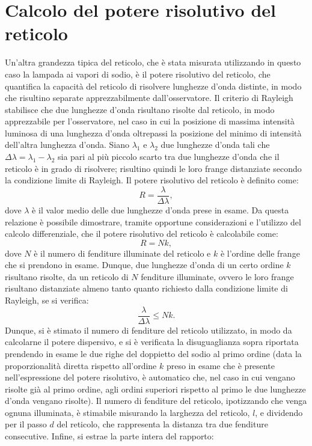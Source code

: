 \documentclass[a4paper,12pt]{article}
\begin{document}
\section{Calcolo del potere risolutivo del reticolo}
Un’altra grandezza tipica del reticolo, che è stata misurata utilizzando in questo caso la lampada ai vapori di sodio, è il potere risolutivo del reticolo, che quantifica la capacità del reticolo di risolvere lunghezze d’onda distinte, in modo che risultino separate apprezzabilmente dall’osservatore. Il criterio di Rayleigh stabilisce che due lunghezze d’onda risultano risolte dal reticolo, in modo apprezzabile per l’osservatore, nel caso in cui la posizione di massima intensità luminosa di una lunghezza d’onda oltrepassi la posizione del minimo di intensità dell’altra lunghezza d’onda.
Siano \( \lambda_1 \) e \( \lambda_2 \) due lunghezze d’onda tali che \( \Delta\lambda = \lambda_1 - \lambda_2 \) sia pari al più piccolo scarto tra due lunghezze d’onda che il reticolo è in grado di risolvere; risultino quindi le loro frange distanziate secondo la condizione limite di Rayleigh.
Il potere risolutivo del reticolo è definito come:
\[
R = \frac{\lambda}{\Delta\lambda},
\]
dove \( \lambda \) è il valor medio delle due lunghezze d’onda prese in esame.
Da questa relazione è possibile dimostrare, tramite opportune considerazioni e l’utilizzo del calcolo differenziale, che il potere risolutivo del reticolo è calcolabile come:
\[
R = Nk,
\]
dove \( N \) è il numero di fenditure illuminate del reticolo e \( k \) è l’ordine delle frange che si prendono in esame.
Dunque, due lunghezze d’onda di un certo ordine \( k \) risultano risolte, da un reticolo di \( N \) fenditure illuminate, ovvero le loro frange risultano distanziate almeno tanto quanto richiesto dalla condizione limite di Rayleigh, se si verifica:
\[
\frac{\lambda}{\Delta\lambda} \leq Nk.
\]
Dunque, si è stimato il numero di fenditure del reticolo utilizzato, in modo da calcolarne il potere dispersivo, e si è verificata la disuguaglianza sopra riportata prendendo in esame le due righe del doppietto del sodio al primo ordine (data la proporzionalità diretta rispetto all’ordine \( k \) preso in esame che è presente nell’espressione del potere risolutivo, è automatico che, nel caso in cui vengano risolte già al primo ordine, agli ordini superiori rispetto al primo le due lunghezze d’onda vengano risolte).
Il numero di fenditure del reticolo, ipotizzando che venga ognuna illuminata, è stimabile misurando la larghezza del reticolo, \( l \), e dividendo per il passo \( d \) del reticolo, che rappresenta la distanza tra due fenditure consecutive. Infine, si estrae la parte intera del rapporto:
\end{document}
